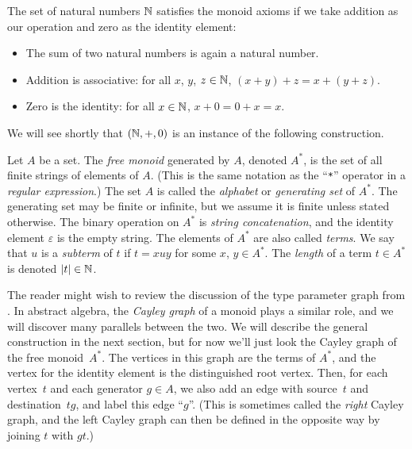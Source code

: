 \documentclass[../generics]{subfiles}
\begin{document}
\begin{example}
The set of natural numbers $\mathbb{N}$ satisfies the monoid axioms if we take addition as our operation and zero as the identity element:
\begin{itemize}
\item The sum of two natural numbers is again a natural number.
\item Addition is associative: for all $x$, $y$, $z\in\mathbb{N}$, $(x+y)+z=x+(y+z)$.
\item Zero is the identity: for all $x\in\mathbb{N}$, $x+0=0+x=x$.
\end{itemize}
\end{example}

We will see shortly that $(\mathbb{N},+,0)$ is an instance of the following construction.

\begin{definition}
Let $A$ be a set. The \emph{free monoid} generated by $A$, denoted $A^*$, is the set of all finite strings of elements of $A$. (This is the same notation as the ``\;\texttt{*}\;'' operator in a \emph{regular expression}.) The set $A$ is called the \emph{alphabet} or \emph{generating set} of $A^*$. The generating set may be finite or infinite, but we assume it is finite unless stated otherwise. The binary operation on $A^*$ is \emph{string concatenation}, and the identity element $\varepsilon$ is the empty string. The elements of $A^*$ are also called \emph{terms}. We say that $u$ is a \emph{subterm} of $t$ if $t=xuy$ for some $x$, $y\in A^*$. The \emph{length} of a term $t\in A^*$ is denoted $|t|\in\mathbb{N}$.
\end{definition}

The reader might wish to review the discussion of the type parameter graph from . In abstract algebra, the \emph{Cayley graph} of a monoid plays a similar role, and we will discover many parallels between the two. We will describe the general construction in the next section, but for now we'll just look the Cayley graph of the free monoid~$A^*$. The vertices in this graph are the terms of $A^*$, and the vertex for the identity element is the distinguished root vertex. Then, for each vertex~$t$ and each generator $g\in A$, we also add an edge with source~$t$ and destination~$tg$, and label this edge ``$g$''. (This is sometimes called the \emph{right} Cayley graph, and the left Cayley graph can then be defined in the opposite way by joining $t$ with $gt$.)
\end{document}
